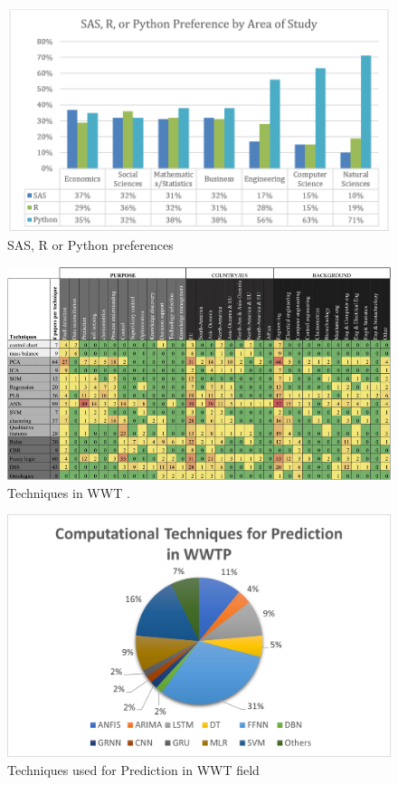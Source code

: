 

\begin{figure}[h]
\centering
\includegraphics[width=\linewidth]{figures/Ch3/BigDataTools.PNG}
\caption{SAS, R or Python preferences \cite{Siddiqui2015}}
\label{f:soft-preferences}
\end{figure}

\begin{figure}[h]
\centering
\includegraphics[width=0.9\linewidth]{figures/Ch3/PaperTable.jpg}
\caption{Techniques in WWT  \cite{Corominas2018}.}
\label{f:Papers Table}
\end{figure}

\begin{figure}[h]
\centering
\includegraphics[width=0.8\linewidth]{figures/Ch3/Prediction_model_dist.png}
\caption{Techniques used for Prediction in WWT field}
\label{f:techniques-prediction}
\end{figure}

